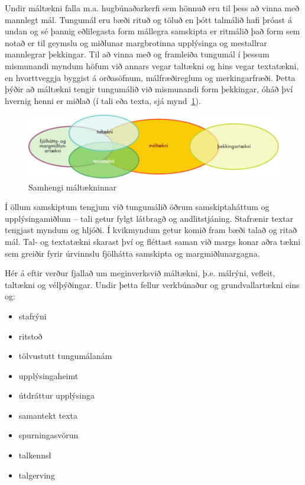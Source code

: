 \documentclass{../../metanetpaper}
\begin{document}
\begin{multicols}{2}

Undir máltækni falla m.a. hugbúnaðarkerfi sem hönnuð eru til þess að vinna með mannlegt mál. Tungumál eru bæði rituð og töluð en þótt talmálið hafi þróast á undan og sé þannig eðlilegasta form mállegra samskipta er ritmálið það form sem notað er til geymslu og miðlunar margbrotinna upplýsinga og mestallrar mannlegrar þekkingar. Til að vinna með og framleiða tungumál í þessum mismunandi myndum höfum við annars vegar taltækni og hins vegar textatækni, en hvorttveggja byggist á orðasöfnum, málfræðireglum og merkingarfræði. Þetta þýðir að máltækni tengir tungumálið við mismunandi form þekkingar, óháð því hvernig henni er miðlað (í tali eða texta, sjá mynd~\ref{fig:ltincontext_is}).

\begin{figure}[htb]
  \center
  \includegraphics[width=\textwidth]{../_media/icelandic/language_technologies}
  \caption{Samhengi máltækninnar}
  \label{fig:ltincontext_is}
\end{figure}

Í öllum samskiptum tengjum við tungumálið öðrum samskiptaháttum og upplýsingamiðlum -- tali getur fylgt látbragð og andlitstjáning. Stafrænir textar tengjast myndum og hljóði. Í kvikmyndum getur komið fram bæði talað og ritað mál. Tal- og textatækni skarast því og fléttast saman við margs konar aðra tækni sem greiðir fyrir úrvinnslu fjölhátta samskipta og margmiðlunargagna.

Hér á eftir verður fjallað um meginverksvið máltækni, þ.e. málrýni, vefleit, taltækni og vélþýðingar. Undir þetta fellur verkbúnaður og grundvallartækni eins og:

\begin{itemize}
\item stafrýni
\item ritstoð
\item tölvustutt tungumálanám
\item upplýsingaheimt 
\item útdráttur upplýsinga
\item samantekt texta
\item spurningasvörun
\item talkennsl
\item talgerving
\end{itemize}


\end{multicols}
\end{document}
